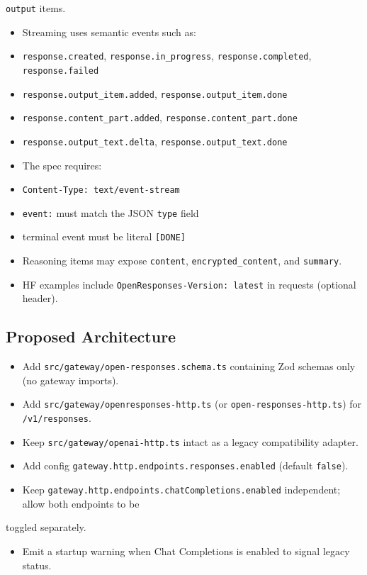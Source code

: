 \texttt{output} items.
\begin{itemize}
  \item Streaming uses semantic events such as:
  \item \texttt{response.created}, \texttt{response.in\_progress}, \texttt{response.completed}, \texttt{response.failed}
  \item \texttt{response.output\_item.added}, \texttt{response.output\_item.done}
  \item \texttt{response.content\_part.added}, \texttt{response.content\_part.done}
  \item \texttt{response.output\_text.delta}, \texttt{response.output\_text.done}
  \item The spec requires:
  \item \texttt{Content-Type: text/event-stream}
  \item \texttt{event:} must match the JSON \texttt{type} field
  \item terminal event must be literal \texttt{[DONE]}
  \item Reasoning items may expose \texttt{content}, \texttt{encrypted\_content}, and \texttt{summary}.
  \item HF examples include \texttt{OpenResponses-Version: latest} in requests (optional header).
\end{itemize}


\subsection{Proposed Architecture}


\begin{itemize}
  \item Add \texttt{src/gateway/open-responses.schema.ts} containing Zod schemas only (no gateway imports).
  \item Add \texttt{src/gateway/openresponses-http.ts} (or \texttt{open-responses-http.ts}) for \texttt{/v1/responses}.
  \item Keep \texttt{src/gateway/openai-http.ts} intact as a legacy compatibility adapter.
  \item Add config \texttt{gateway.http.endpoints.responses.enabled} (default \texttt{false}).
  \item Keep \texttt{gateway.http.endpoints.chatCompletions.enabled} independent; allow both endpoints to be
\end{itemize}

toggled separately.
\begin{itemize}
  \item Emit a startup warning when Chat Completions is enabled to signal legacy status.
\end{itemize}


